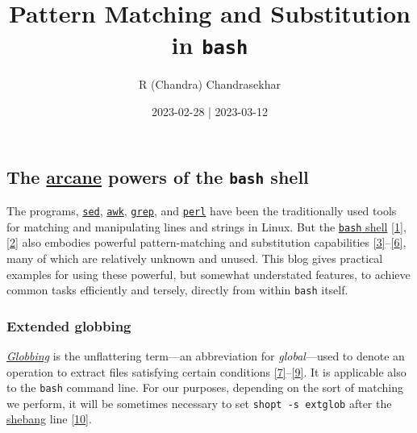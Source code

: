 \documentclass[
  a4paper,
]{article}
\title{Pattern Matching and Substitution in \texttt{bash}}
\author{R (Chandra) Chandrasekhar}
\date{2023-02-28 | 2023-03-12}
\begin{document}
\maketitle

\thispagestyle{empty}


\hypertarget{the-arcane-powers-of-the-bash-shell}{%
\subsection{\texorpdfstring{The
\href{https://www.thefreedictionary.com/arcane}{arcane} powers of the
\texttt{bash}
shell}{The arcane powers of the bash shell}}\label{the-arcane-powers-of-the-bash-shell}}

The programs, \href{https://www.gnu.org/software/sed/}{\texttt{sed}},
\href{https://www.grymoire.com/Unix/Awk.html}{\texttt{awk}},
\href{https://www.gnu.org/software/grep/manual/grep.html}{\texttt{grep}},
and
\href{https://learnbyexample.github.io/learn_perl_oneliners/line-processing.html}{\texttt{perl}}
have been the traditionally used tools for matching and manipulating
lines and strings in Linux. But the
\href{https://www.gnu.org/software/bash/}{\texttt{bash} shell}
\protect\hyperlink{ref-newham2005}{{[}1{]}},
\protect\hyperlink{ref-ryder2018}{{[}2{]}} also embodies powerful
pattern-matching and substitution capabilities
\protect\hyperlink{ref-parametersubs}{{[}3{]}}--\protect\hyperlink{ref-stringops}{{[}6{]}},
many of which are relatively unknown and unused. This blog gives
practical examples for using these powerful, but somewhat understated
features, to achieve common tasks efficiently and tersely, directly from
within \texttt{bash} itself.

\hypertarget{extended-globbing}{%
\subsubsection{Extended globbing}\label{extended-globbing}}

\href{https://en.wikipedia.org/w/index.php?title=Glob_(programming)\&oldid=1133836865}{\emph{Globbing}}
is the unflattering term---an abbreviation for \emph{global}---used to
denote an operation to extract files satisfying certain conditions
\protect\hyperlink{ref-glob2023}{{[}7{]}}--\protect\hyperlink{ref-globhistory}{{[}9{]}}.
It is applicable also to the \texttt{bash} command line. For our
purposes, depending on the sort of matching we perform, it will be
sometimes necessary to set \texttt{shopt\ -s\ extglob} after the
\href{https://en.wikipedia.org/wiki/Shebang_(Unix)}{shebang} line
\protect\hyperlink{ref-extglob}{{[}10{]}}.
\end{document}
